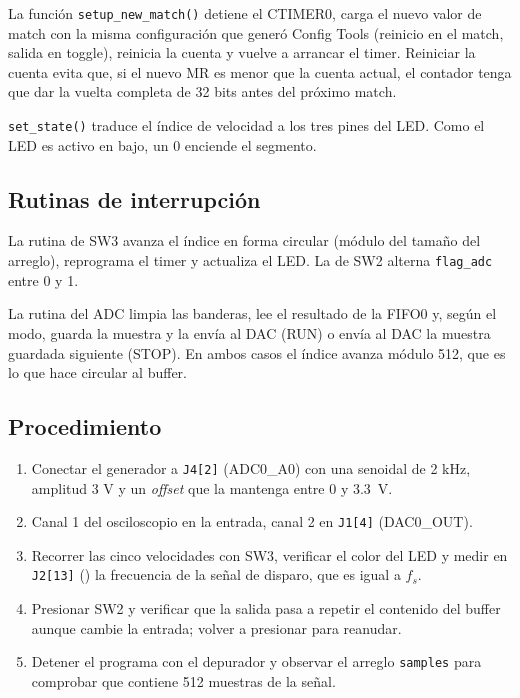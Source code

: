 \documentclass[11pt,a4paper]{article}
\begin{document}
La función \texttt{setup\_new\_match()} detiene el CTIMER0, carga el nuevo valor de match
con la misma configuración que generó Config Tools (reinicio en el match,
salida en toggle), reinicia la cuenta y vuelve a arrancar el timer. Reiniciar
la cuenta evita que, si el nuevo MR es menor que la cuenta actual, el
contador tenga que dar la vuelta completa de 32 bits antes del próximo match.

\texttt{set\_state()} traduce el índice de velocidad a los tres pines del LED.
Como el LED es activo en bajo, un 0 enciende el segmento.

\subsection{Rutinas de interrupción}

La rutina de SW3 avanza el índice en forma circular (módulo del tamaño del
arreglo), reprograma el timer y actualiza el LED. La de SW2 alterna
\texttt{flag\_adc} entre 0 y 1.

La rutina del ADC limpia las banderas, lee el resultado de la FIFO0 y, según
el modo, guarda la muestra y la envía al DAC (RUN) o envía al DAC la muestra
guardada siguiente (STOP). En ambos casos el índice avanza módulo 512, que es
lo que hace circular al buffer.

\label{sec:verificacion}

\subsection{Procedimiento}

\begin{enumerate}[nosep]
  \item Conectar el generador a \texttt{J4[2]} (ADC0\_A0) con una senoidal
        de 2 kHz, amplitud 3 V y un \emph{offset}
        que la mantenga entre 0 y \qty{3.3}{\volt}.
  \item Canal 1 del osciloscopio en la entrada, canal 2 en \texttt{J1[4]}
        (DAC0\_OUT).
  \item Recorrer las cinco velocidades con SW3, verificar el color del LED y
        medir en \texttt{J2[13]} () la frecuencia de la señal de
        disparo, que es igual a $f_s$.
  \item Presionar SW2 y verificar que la salida pasa a repetir el contenido
        del buffer aunque cambie la entrada; volver a presionar para
        reanudar.
  \item Detener el programa con el depurador y observar el arreglo
        \texttt{samples} para comprobar que contiene 512 muestras de la señal.
\end{enumerate}
\end{document}
